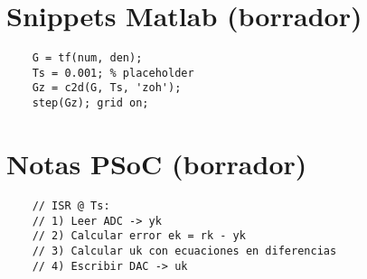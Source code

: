 \appendices
\section{Snippets Matlab (borrador)}
\begin{verbatim}
	G = tf(num, den);
	Ts = 0.001; % placeholder
	Gz = c2d(G, Ts, 'zoh');
	step(Gz); grid on;
\end{verbatim}

\section{Notas PSoC (borrador)}
\begin{verbatim}
	// ISR @ Ts:
	// 1) Leer ADC -> yk
	// 2) Calcular error ek = rk - yk
	// 3) Calcular uk con ecuaciones en diferencias
	// 4) Escribir DAC -> uk
\end{verbatim}